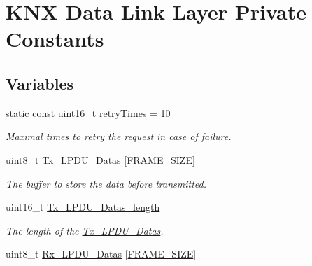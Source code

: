 \hypertarget{group___k_n_x___d_l___private___consts}{}\section{K\+NX Data Link Layer Private Constants}
\label{group___k_n_x___d_l___private___consts}
\subsection*{Variables}
\begin{DoxyCompactItemize}
\item 
static const uint16\+\_\+t \hyperlink{group___k_n_x___d_l___private___consts_gac60d0cbde03099cfdf926cb87ad37206}{retry\+Times} = 10\hypertarget{group___k_n_x___d_l___private___consts_gac60d0cbde03099cfdf926cb87ad37206}{}\label{group___k_n_x___d_l___private___consts_gac60d0cbde03099cfdf926cb87ad37206}

\begin{DoxyCompactList}\small\item\em Maximal times to retry the request in case of failure. \end{DoxyCompactList}\item 
uint8\+\_\+t \hyperlink{group___k_n_x___d_l___private___consts_ga82b0e0c613d6742e36e1b84d816bae53}{Tx\+\_\+\+L\+P\+D\+U\+\_\+\+Datas} \mbox{[}\hyperlink{group___k_n_x___frame_gaf9b1b2ba12857a4bf11289dac8c5462d}{F\+R\+A\+M\+E\+\_\+\+S\+I\+ZE}\mbox{]}\hypertarget{group___k_n_x___d_l___private___consts_ga82b0e0c613d6742e36e1b84d816bae53}{}\label{group___k_n_x___d_l___private___consts_ga82b0e0c613d6742e36e1b84d816bae53}

\begin{DoxyCompactList}\small\item\em The buffer to store the data before transmitted. \end{DoxyCompactList}\item 
uint16\+\_\+t \hyperlink{group___k_n_x___d_l___private___consts_ga16be76eb705adbb96d8b8b402326c8de}{Tx\+\_\+\+L\+P\+D\+U\+\_\+\+Datas\+\_\+length}\hypertarget{group___k_n_x___d_l___private___consts_ga16be76eb705adbb96d8b8b402326c8de}{}\label{group___k_n_x___d_l___private___consts_ga16be76eb705adbb96d8b8b402326c8de}

\begin{DoxyCompactList}\small\item\em The length of the \hyperlink{group___k_n_x___d_l___private___consts_ga82b0e0c613d6742e36e1b84d816bae53}{Tx\+\_\+\+L\+P\+D\+U\+\_\+\+Datas}. \end{DoxyCompactList}\item 
uint8\+\_\+t \hyperlink{group___k_n_x___d_l___private___consts_gacbfe30d397d569ba00fc3e27f4f3d782}{Rx\+\_\+\+L\+P\+D\+U\+\_\+\+Datas} \mbox{[}\hyperlink{group___k_n_x___frame_gaf9b1b2ba12857a4bf11289dac8c5462d}{F\+R\+A\+M\+E\+\_\+\+S\+I\+ZE}\mbox{]}\hypertarget{group___k_n_x___d_l___private___consts_gacbfe30d397d569ba00fc3e27f4f3d782}{}\label{group___k_n_x___d_l___private___consts_gacbfe30d397d569ba00fc3e27f4f3d782}


\end{DoxyCompactItemize}
